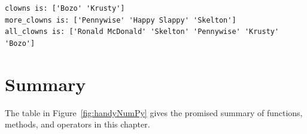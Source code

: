 \begin{Verbatim}[fontsize=\small,samepage=true,frame=leftline,framesep=5mm,framerule=1mm]
clowns is: ['Bozo' 'Krusty']
more_clowns is: ['Pennywise' 'Happy Slappy' 'Skelton']
all_clowns is: ['Ronald McDonald' 'Skelton' 'Pennywise' 'Krusty' 'Bozo']
\end{Verbatim}



\section{Summary}

The table in Figure~\ref{fig:handyNumPy} gives the promised summary of
functions, methods, and operators in this chapter.

\setlength\extrarowheight{5pt}

